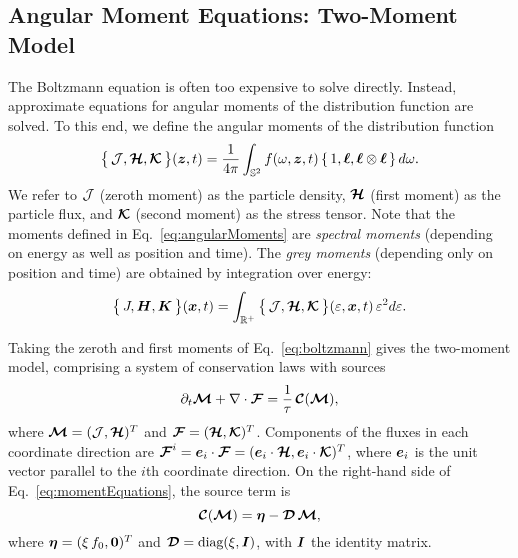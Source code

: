 \subsection{Angular Moment Equations: Two-Moment Model}

The Boltzmann equation is often too expensive to solve directly.  
Instead, approximate equations for angular moments of the distribution function are solved.  
To this end, we define the angular moments of the distribution function
\begin{equation}
  \big\{\,\mathcal{J},\boldsymbol{\mathcal{H}},\boldsymbol{\mathcal{K}}\,\big\}(\boldsymbol{z},t)
  =\frac{1}{4\pi}\int_{\mathbb{S}^{2}}f(\omega,\boldsymbol{z},t)\,\{\,1,\boldsymbol{\ell},\boldsymbol{\ell}\otimes\boldsymbol{\ell}\,\}\,d\omega.  
  \label{eq:angularMoments}
\end{equation}
We refer to $\mathcal{J}$ (zeroth moment) as the particle density, $\boldsymbol{\mathcal{H}}$ (first moment) as the particle flux, and $\boldsymbol{\mathcal{K}}$ (second moment) as the stress tensor.  
Note that the moments defined in Eq.~\eqref{eq:angularMoments} are \emph{spectral moments} (depending on energy as well as position and time).  
The \emph{grey moments} (depending only on position and time) are obtained by integration over energy:
\begin{equation}
  \big\{\,J,\boldsymbol{H},\boldsymbol{K}\,\big\}(\boldsymbol{x},t)
  =\int_{\mathbb{R}^{+}}\big\{\,\mathcal{J},\boldsymbol{\mathcal{H}},\boldsymbol{\mathcal{K}}\,\big\}(\varepsilon,\boldsymbol{x},t)\,\varepsilon^{2}d\varepsilon.  
\end{equation}

Taking the zeroth and first moments of Eq.~\eqref{eq:boltzmann} gives the two-moment model, comprising a system of conservation laws with sources
\begin{equation}
  \partial_{t}{\boldsymbol{\mathcal{M}}}+\nabla\cdot\boldsymbol{\mathcal{F}}=\frac{1}{\tau}\,\boldsymbol{\mathcal{C}}(\boldsymbol{\mathcal{M}}),
  \label{eq:momentEquations}
\end{equation}
where $\boldsymbol{\mathcal{M}}=(\mathcal{J},\boldsymbol{\mathcal{H}})^{T}$ and $\boldsymbol{\mathcal{F}}=(\boldsymbol{\mathcal{H}},\boldsymbol{\mathcal{K}})^{T}$.  
Components of the fluxes in each coordinate direction are $\boldsymbol{\mathcal{F}}^{i}=\boldsymbol{e}_{i}\cdot\boldsymbol{\mathcal{F}}=(\boldsymbol{e}_{i}\cdot\boldsymbol{\mathcal{H}},\boldsymbol{e}_{i}\cdot\boldsymbol{\mathcal{K}})^{T}$, where $\boldsymbol{e}_{i}$ is the unit vector parallel to the $i$th coordinate direction.  
On the right-hand side of Eq.~\eqref{eq:momentEquations}, the source term is
\begin{equation}
  \boldsymbol{\mathcal{C}}(\boldsymbol{\mathcal{M}})=\boldsymbol{\eta}-\boldsymbol{\mathcal{D}}\,\boldsymbol{\mathcal{M}}, 
  \label{eq:collisionTermMoments}
\end{equation}
where $\boldsymbol{\eta}=(\xi\,f_{0},\boldsymbol{0})^{T}$ and $\boldsymbol{\mathcal{D}}=\mbox{diag}(\xi,\boldsymbol{I})$, with $\boldsymbol{I}$ the identity matrix.  

